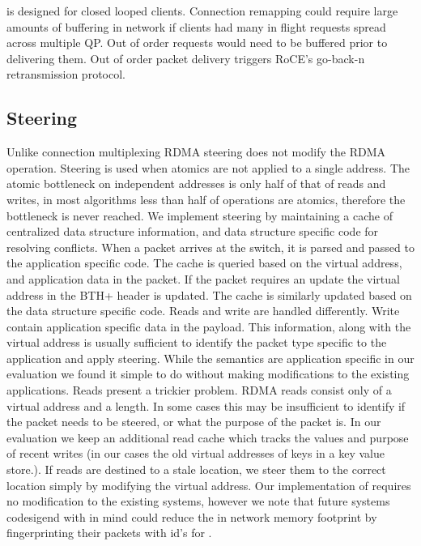 \sword is designed for closed looped clients. Connection
remapping could require large amounts of buffering in
network if clients had many in flight requests spread across
multiple QP. Out of order requests would need to be buffered
prior to delivering them. Out of order packet delivery
triggers RoCE's go-back-n retransmission protocol.

\subsection{Steering}

Unlike connection multiplexing RDMA steering does not modify
the RDMA operation. Steering is used when atomics are not
applied to a single address. The atomic bottleneck on
independent addresses is only half of that of reads and
writes, in most algorithms less than half of operations are
atomics, therefore the bottleneck is never reached. 
We implement steering by maintaining a cache of centralized
data structure information, and data structure specific code
for resolving conflicts. When a packet arrives at the
switch, it is parsed and passed to the application specific
code. The cache is queried based on the virtual address, and
application data in the packet. If the packet requires an
update the virtual address in the BTH+ header is updated.
The cache is similarly updated based on the data structure
specific code.
Reads and write are handled differently. Write contain
application specific data in the payload. This information,
along with the virtual address is usually sufficient to
identify the packet type specific to the application and
apply steering. While the semantics are application specific
in our evaluation we found it simple to do without making
modifications to the existing applications.
Reads present a trickier problem. RDMA reads consist only of
a virtual address and a length. In some cases this may be
insufficient to identify if the packet needs to be steered,
or what the purpose of the packet is. In our evaluation we
keep an additional read cache which tracks the values and
purpose of recent writes (in our cases the old virtual
addresses of keys in a key value store.). If reads are
destined to a stale location, we steer them to the correct
location simply by modifying the virtual address.
Our implementation of \sword requires no modification to the
existing systems, however we note that future systems
codesigend with \sword in mind could reduce the in network
memory footprint by fingerprinting their packets with id's
for {\sword}.






